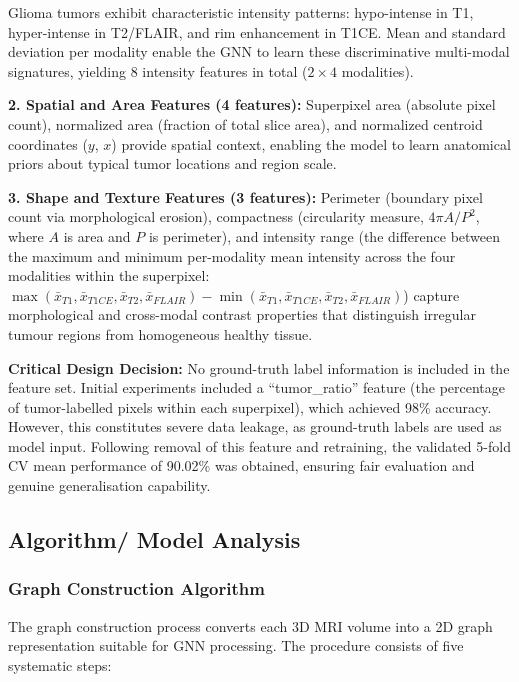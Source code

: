 \documentclass{article}
\begin{document}
Glioma tumors exhibit characteristic intensity patterns: hypo-intense in T1, hyper-intense in T2/FLAIR, and rim enhancement in T1CE. Mean and standard deviation per modality enable the GNN to learn these discriminative multi-modal signatures, yielding 8 intensity features in total ($2 \times 4$ modalities).

\textbf{2. Spatial and Area Features (4 features):} Superpixel area (absolute pixel count), normalized area (fraction of total slice area), and normalized centroid coordinates ($y$, $x$) provide spatial context, enabling the model to learn anatomical priors about typical tumor locations and region scale.

\textbf{3. Shape and Texture Features (3 features):} Perimeter (boundary pixel count via morphological erosion), compactness (circularity measure, $4\pi A / P^2$, where $A$ is area and $P$ is perimeter), and intensity range (the difference between the maximum and minimum per-modality mean intensity across the four modalities within the superpixel: $\max(\bar{x}_{T1},\bar{x}_{T1CE},\bar{x}_{T2},\bar{x}_{FLAIR}) - \min(\bar{x}_{T1},\bar{x}_{T1CE},\bar{x}_{T2},\bar{x}_{FLAIR})$) capture morphological and cross-modal contrast properties that distinguish irregular tumour regions from homogeneous healthy tissue.

\textbf{Critical Design Decision:} No ground-truth label information is included in the feature set. Initial experiments included a ``tumor\_ratio'' feature (the percentage of tumor-labelled pixels within each superpixel), which achieved 98\% accuracy. However, this constitutes severe data leakage, as ground-truth labels are used as model input. Following removal of this feature and retraining, the validated 5-fold CV mean performance of 90.02\% was obtained, ensuring fair evaluation and genuine generalisation capability.


\subsection{Algorithm/ Model Analysis}

\subsubsection{Graph Construction Algorithm}

The graph construction process converts each 3D MRI volume into a 2D graph representation suitable for GNN processing. The procedure consists of five systematic steps:
\end{document}
